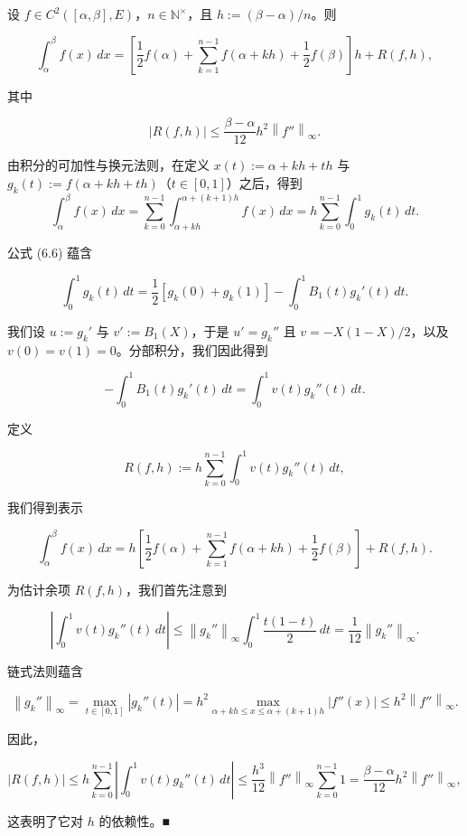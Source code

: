 \begin{theorem}

设 $ f \in C^2([\alpha, \beta], E) $，$ n \in \mathbb{N}^\times $，且 $ h := (\beta - \alpha)/n $。则

\[
\int_\alpha^\beta f(x)\,dx = \left[ \frac{1}{2}f(\alpha) + \sum_{k=1}^{n-1} f(\alpha + kh) + \frac{1}{2}f(\beta) \right]h + R(f, h) ,
\]

其中

\[
\left|R(f, h)\right| \le \frac{\beta - \alpha}{12}h^2\left\|f''\right\|_\infty .
\]

\proofhead
由积分的可加性与换元法则，在定义 $ x(t) := \alpha + kh + th $ 与 $ g_k(t) := f(\alpha + kh + th) $（$ t \in [0, 1] $）之后，得到
\[
\int_\alpha^\beta f(x)\,dx = \sum_{k=0}^{n-1}\int_{\alpha+kh}^{\alpha+(k+1)h} f(x)\,dx = h\sum_{k=0}^{n-1}\int_0^1 g_k(t)\,dt .
\]

公式 (6.6) 蕴含

\[
\int_0^1 g_k(t)\,dt = \frac{1}{2}[g_k(0) + g_k(1)] - \int_0^1 B_1(t)g_k'(t)\,dt .
\]

我们设 $ u := g_k' $ 与 $ v' := B_1(X) $，于是 $ u' = g_k'' $ 且 $ v = -X(1 - X)/2 $，以及 $ v(0) = v(1) = 0 $。分部积分，我们因此得到

\[
-\int_0^1 B_1(t)g_k'(t)\,dt = \int_0^1 v(t)g_k''(t)\,dt .
\]

定义

\[
R(f, h) := h\sum_{k=0}^{n-1}\int_0^1 v(t)g_k''(t)\,dt ,
\]

我们得到表示

\[
\int_\alpha^\beta f(x)\,dx = h\left[ \frac{1}{2}f(\alpha) + \sum_{k=1}^{n-1} f(\alpha + kh) + \frac{1}{2}f(\beta) \right] + R(f, h) .
\]

为估计余项 $ R(f, h) $，我们首先注意到

\[
\left|\int_0^1 v(t)g_k''(t)\,dt\right| \le \left\|g_k''\right\|_\infty\int_0^1\frac{t(1 - t)}{2}\,dt = \frac{1}{12}\left\|g_k''\right\|_\infty .
\]

链式法则蕴含

\[
\left\|g_k''\right\|_\infty = \max_{t\in[0,1]}\left|g_k''(t)\right| = h^2\max_{\alpha+kh\le x\le\alpha+(k+1)h}\left|f''(x)\right| \le h^2\left\|f''\right\|_\infty .
\]

因此，

\[
\left|R(f, h)\right| \le h\sum_{k=0}^{n-1}\left|\int_0^1 v(t)g_k''(t)\,dt\right| \le \frac{h^3}{12}\left\|f''\right\|_\infty\sum_{k=0}^{n-1}1 = \frac{\beta - \alpha}{12}h^2\left\|f''\right\|_\infty ,
\]

这表明了它对 $ h $ 的依赖性。\nobreak\hspace{0.35em}■

\end{theorem}


